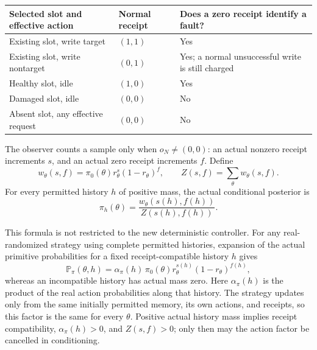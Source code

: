 \documentclass[
  english,
  11pt,
  oneside]{book}
\newcounter{none} %
\begin{document}
{\def\LTcaptype{none} %
\begin{longtable}[]{@{}
  >{\raggedright\arraybackslash}p{}
  >{\raggedright\arraybackslash}p{}
  >{\raggedright\arraybackslash}p{}@{}}
\toprule\noalign{}
\begin{minipage}[b]{\linewidth}\raggedright
Selected slot and effective action
\end{minipage} & \begin{minipage}[b]{\linewidth}\raggedright
Normal receipt
\end{minipage} & \begin{minipage}[b]{\linewidth}\raggedright
Does a zero receipt identify a fault?
\end{minipage} \\
\midrule\noalign{}
\endhead
\bottomrule\noalign{}
\endlastfoot
Existing slot, write target & \((1,1)\) & Yes \\
Existing slot, write nontarget & \((0,1)\) & Yes; a normal unsuccessful write is still charged \\
Healthy slot, idle & \((1,0)\) & Yes \\
Damaged slot, idle & \((0,0)\) & No \\
Absent slot, any effective request & \((0,0)\) & No \\
\end{longtable}
}

The observer counts a sample only when \(o_N\ne(0,0)\): an actual nonzero receipt increments \(s\), and an actual zero receipt increments \(f\). Define \[w_\theta(s,f)=\pi_0(\theta)r_\theta^s(1-r_\theta)^f,\qquad Z(s,f)=\sum_\theta w_\theta(s,f).\] For every permitted history \(h\) of positive mass, the actual conditional posterior is \[\boxed{\displaystyle\pi_h(\theta)=\frac{w_\theta(s(h),f(h))}{Z(s(h),f(h))}.}\]

This formula is not restricted to the new deterministic controller. For any real-randomized strategy using complete permitted histories, expansion of the actual primitive probabilities for a fixed receipt-compatible history \(h\) gives \[\mathbb P_\pi(\theta,h)=\alpha_\pi(h)\,\pi_0(\theta)r_\theta^{s(h)}(1-r_\theta)^{f(h)},\] whereas an incompatible history has actual mass zero. Here \(\alpha_\pi(h)\) is the product of the real action probabilities along that history. The strategy updates only from the same initially permitted memory, its own actions, and receipts, so this factor is the same for every \(\theta\). Positive actual history mass implies receipt compatibility, \(\alpha_\pi(h)>0\), and \(Z(s,f)>0\); only then may the action factor be cancelled in conditioning.
\end{document}
